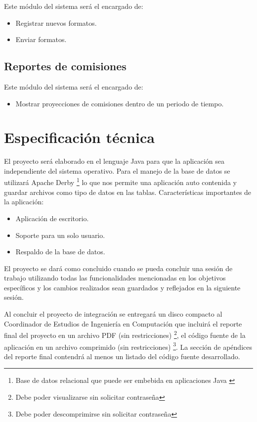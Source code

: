 Este m\'odulo del sistema ser\'a el encargado de:
\begin{itemize}
	\item Registrar nuevos formatos.
	\item Enviar formatos.
\end{itemize}

\subsection*{Reportes de comisiones}

Este m\'odulo del sistema ser\'a el encargado de:
\begin{itemize}
	\item Mostrar proyecciones de comisiones dentro de un periodo de tiempo.
\end{itemize}

\section{Especificación técnica}
El proyecto ser\'a elaborado en el lenguaje Java para que la aplicación sea independiente del sistema operativo. Para el manejo de la base de datos se utilizará Apache Derby \footnote{Base de datos relacional que puede ser embebida en aplicaciones Java \cite{www:derby}} lo que nos permite una aplicación auto contenida y guardar archivos como tipo de datos en las tablas.
Características importantes de la aplicación:
\begin{itemize}
	\item Aplicación de escritorio.
	\item Soporte para un solo usuario.
	\item Respaldo de la base de datos.
\end{itemize}

El proyecto se dará como concluido cuando se pueda concluir una sesión de trabajo utilizando todas las funcionalidades mencionadas en los objetivos específicos y los cambios realizados sean guardados y reflejados en la siguiente sesión.

Al concluir el proyecto de integración se entregará un disco compacto al Coordinador
de Estudios de Ingeniería en Computación que incluirá el reporte final del proyecto
en un archivo PDF (sin restricciones) \footnote{Debe poder visualizarse sin solicitar contraseña}, el código fuente de la aplicación en un archivo comprimido (sin restricciones) \footnote{Debe poder descomprimirse sin solicitar contraseña}. La sección de apéndices del reporte final contendrá al menos un listado del código fuente desarrollado.

